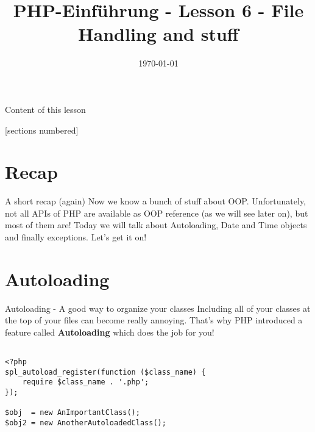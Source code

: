 


\newcommand{\topic}{
	PHP-Einführung - Lesson 6 - File Handling and stuff
}

\title{\topic}
\date{\today}



\maketitle

\begin{frame}{Content of this lesson}

	[sections numbered]
	\tableofcontents

\end{frame}

\section{Recap}


\begin{frame}{A short recap (again)}
	Now we know a bunch of stuff about OOP. Unfortunately, not all APIs of PHP are available as OOP reference (as we will see later on), but most of them are! \pause
	Today we will talk about Autoloading, Date and Time objects and finally exceptions. Let's get it on!
\end{frame}

\section{Autoloading}

\begin{frame}[fragile]{Autoloading - A good way to organize your classes}
	Including all of your classes at the top of your files can become really annoying. \pause That's why PHP introduced a feature called \textbf{Autoloading} which does the job for you! \pause
	
	\begin{lstlisting}
	
<?php
spl_autoload_register(function ($class_name) {
    require $class_name . '.php';
});

$obj  = new AnImportantClass();
$obj2 = new AnotherAutoloadedClass(); 

	\end{lstlisting}
	
\end{frame}


